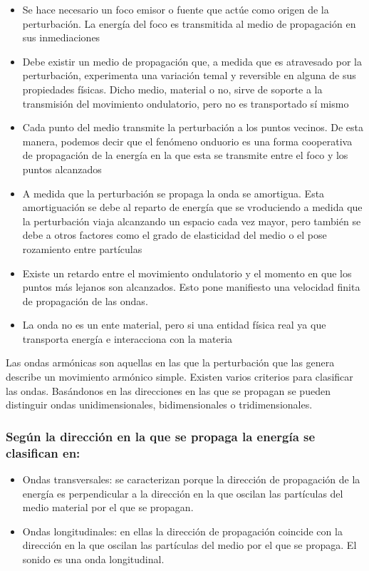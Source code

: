 \documentclass[11pt]{article}
\begin{document}
\begin{multicols}{2}
\begin{itemize}
						\item Se hace necesario un foco emisor o fuente que actúe como origen de la perturbación. La energía del foco es transmitida al medio de propagación en sus inmediaciones
						\item Debe existir un medio de propagación que, a medida que es atravesado por la perturbación, experimenta una variación temal y reversible en alguna de sus propiedades físicas. Dicho medio, material o no, sirve de soporte a la transmisión del movimiento ondulatorio, pero no es transportado sí mismo
						\item Cada punto del medio transmite la perturbación a los puntos vecinos. De esta manera, podemos decir que el fenómeno onduorio es una forma cooperativa de propagación de la energía en la que esta se transmite entre el foco y los puntos alcanzados
						\item A medida que la perturbación se propaga la onda se amortigua. Esta amortiguación se debe al reparto de energía que se vroduciendo a medida que la perturbación viaja alcanzando un espacio cada vez mayor, pero también se debe a otros factores como el grado de elasticidad del medio o el pose rozamiento entre partículas
						\item Existe un retardo entre el movimiento ondulatorio y el momento en que los puntos más lejanos son alcanzados. Esto pone manifiesto una velocidad finita de propagación de las ondas.
						\item La onda no es un ente material, pero si una entidad física real ya que transporta energía e interacciona con la materia

				
				\end{itemize}

				Las ondas armónicas son aquellas en las que la perturbación que las genera describe un movimiento armónico simple.
				Existen varios criterios para clasificar las ondas. Basándonos en las direcciones en las que se propagan se pueden distinguir ondas unidimensionales, bidimensionales o tridimensionales. 

				\subsubsection{Según la dirección en la que se propaga la energía se clasifican en:}

						\begin{itemize}

							\item Ondas transversales: se caracterizan porque la dirección de propagación de la energía es perpendicular a la dirección en la que oscilan las partículas del medio material por el que se propagan.
							\item Ondas longitudinales: en ellas la dirección de propagación coincide con la dirección en la que oscilan las partículas del medio por el que se propaga. El sonido es una onda longitudinal.


\end{itemize}
\end{multicols}
\end{document}
